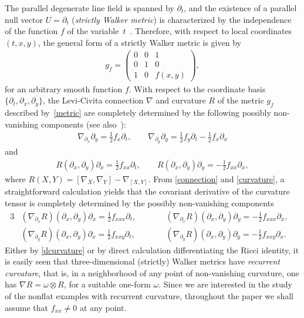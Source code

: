 \documentclass[10pt,a4paper]{amsart}
\numberwithin{equation}{section}
\begin{document}
The parallel degenerate line f\/ield is spanned by $\partial_{t}$, and the existence of a parallel null vector $U = \partial_{t}$ ({\em strictly Walker metric}) is {characterized} by the independence of {the function $f$} of the variable~$t$~\cite{W}. Therefore, with respect to local coordinates~$(t,x,y)$, the general form of a strictly Walker metric is given by
\begin{gather}\label{metric}
g_f =\left(
\begin{matrix}
0 & 0 & 1 \\
0 & 1 & 0 \\
1 & 0 & f(x,y)
\end{matrix}
\right),
\end{gather}
for an arbitrary smooth function $f$. With respect to the coordinate basis $\{\partial_t,\partial_x,\partial_y\}$, the Levi-Civita connection $\nabla$ and curvature $R$ of the metric $g_f$ described by~\eqref{metric} are completely determined by the following possibly non-vanishing components (see also~\cite{ChGRVA}):
\begin{gather}\label{connection}
\nabla_{\partial_x} \partial_y = \tfrac{1}{2} f_x \partial_t, \qquad \nabla_{\partial_y} \partial_y = \tfrac{1}{2} f_y \partial_t - \tfrac{1}{2} f_x \partial_x
\end{gather}
and
\begin{gather}\label{curvature}
R(\partial_x,\partial_y)\partial_x = \tfrac{1}{2} f_{xx} \partial_t, \qquad R(\partial_x,\partial_y)\partial_y = -\tfrac{1}{2} f_{xx} \partial_x,
\end{gather}
where $R(X,Y)=[\nabla_X,\nabla_Y]-\nabla_{[X,Y]}$. From \eqref{connection} and \eqref{curvature}, a straightforward calculation yields that the covariant derivative of the curvature tensor is completely determined by the possibly non-vanishing components
\begin{alignat}{3}
& (\nabla _{\partial_x} R) (\partial_x,\partial_y)\partial_x=\tfrac{1}{2} f_{xxx} \partial_t,\qquad&& (\nabla _{\partial_x} R) (\partial_x,\partial_y)\partial_y=-\tfrac{1}{2} f_{xxx} \partial_x, & \nonumber\\
& (\nabla_{\partial_y} R) (\partial_x,\partial_y)\partial_x=\tfrac{1}{2} f_{xxy} \partial_t ,\qquad && (\nabla_{\partial_y} R) (\partial_x,\partial_y)\partial_y=-\tfrac{1}{2} f_{xxy} \partial_x .& \label{dcurvature}
\end{alignat}
Either by \eqref{dcurvature} or by direct calculation dif\/ferentiating the Ricci identity, it is easily seen that three-dimensional (strictly) Walker metrics have {\em recurrent curvature}, that is, in a neighborhood of any point of non-vanishing curvature, one has $\nabla R =\omega \otimes R$, for a suitable one-form $\omega$. Since we are interested in the study of the nonf\/lat examples with recurrent curvature, throughout the paper we shall assume that $f_{xx} \neq 0$ at any point.
\end{document}
